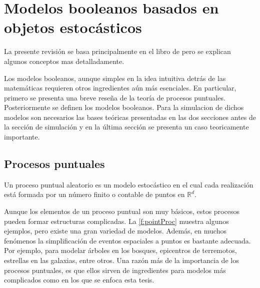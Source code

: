 \chapter{Modelos booleanos basados en objetos estoc\'asticos}
\label{ch3:booleanModels}

La presente revisi\'on se basa principalmente en el libro de \citet{lantuejoul_geostatistical_2002} pero se explican algunos conceptos mas detalladamente.

Los modelos booleanos, aunque simples en la idea intuitiva detr\'as de las matem\'aticas requieren otros ingredientes a\'un m\'as esenciales.
En particular, primero se presenta una breve rese\~na de la teor\'ia de procesos puntuales. Posteriormente se definen los modelos booleanos. Para la simulacion de dichos modelos son necesarios las bases te\'oricas presentadas en las dos secciones antes de la secci\'on de simulaci\'on y en la \'ultima secci\'on se presenta un caso teoricamente importante.

\section{Procesos puntuales}

Un proceso puntual aleatorio es un modelo estoc\'astico \citep{lantuejoul_geostatistical_2002} en el cual cada realizaci\'on est\'a formada por un n\'umero finito o contable de puntos en $\mathbb{R}^d$.

Aunque los elementos de un proceso puntual son muy b\'asicos, estos procesos pueden formar estructuras complicadas. La \autoref{f:pointProc} muestra algunos ejemplos, pero existe una gran variedad de modelos. Adem\'as, en muchos fen\'omenos la simplificaci\'on de eventos espaciales a puntos es bastante adecuada. Por ejemplo, para modelar \'arboles en los bosques, epicentros de terremotos, estrellas en las galaxias, entre otros. Una raz\'on m\'as de la importancia de los procesos puntuales, es que ellos sirven de ingredientes para modelos m\'as complicados como en los que se enfoca esta tesis.

